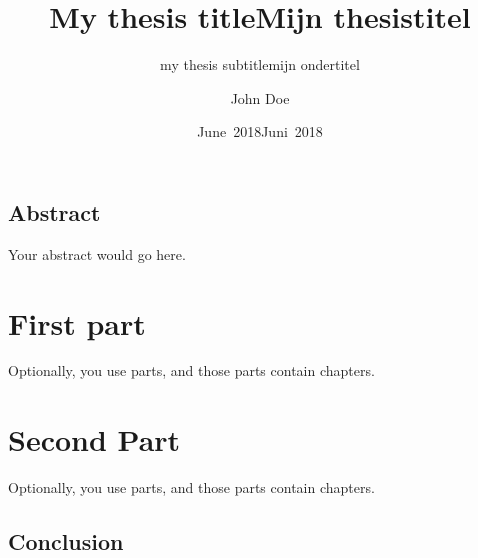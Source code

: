 \documentclass[a4paper]{book}
\title{My thesis title}
\subtitle{my thesis subtitle}
\author{John Doe}
\date{June~2018}
\begin{document}
\frontmatter
\maketitle%

\title{Mijn thesistitel}
%
\subtitle{mijn ondertitel}
\date{Juni~2018}%
%
\maketitle%

\chapter{Abstract}

Your abstract would go here.

\tableofcontents%

\mainmatter%
\part{First part}%

Optionally, you use parts, and those parts contain chapters.

\part{Second Part}%

Optionally, you use parts, and those parts contain chapters.

\backmatter%
\chapter{Conclusion}

\end{document}
